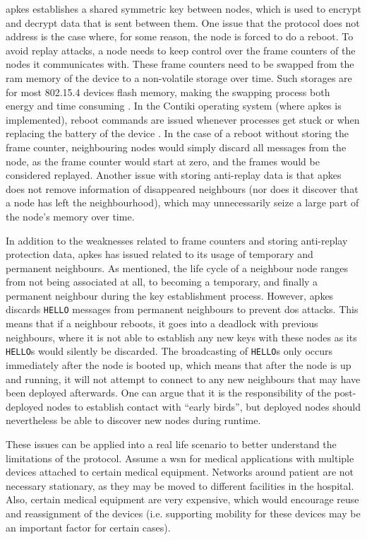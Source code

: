 \gls{apkes} establishes a shared symmetric key between nodes, which is used to encrypt and decrypt data that is sent between them. One issue that the protocol does not address is the case where, for some reason, the node is forced to do a reboot. To avoid replay attacks, a node needs to keep control over the frame counters of the nodes it communicates with. These frame counters need to be swapped from the \gls{ram} memory of the device to a non-volatile storage over time. Such storages are for most 802.15.4 devices flash memory, making the swapping process both energy and time consuming \cite{krentz2015handling}. In the Contiki operating system (where \gls{apkes} is implemented), reboot commands are issued whenever processes get stuck or when replacing the battery of the device \cite{dunkels2004contiki}. In the case of a reboot without storing the frame counter, neighbouring nodes would simply discard all messages from the node, as the frame counter would start at zero, and the frames would be considered replayed. Another issue with storing anti-replay data is that \gls{apkes} does not remove information of disappeared neighbours (nor does it discover that a node has left the neighbourhood), which may unnecessarily seize a large part of the node's memory over time.  

In addition to the weaknesses related to frame counters and storing anti-replay protection data, \gls{apkes} has issued related to its usage of temporary and permanent neighbours. As mentioned, the life cycle of a neighbour node ranges from not being associated at all, to becoming a temporary, and finally a permanent neighbour during the key establishment process. However, \gls{apkes} discards \texttt{HELLO} messages from permanent neighbours to prevent \gls{dos} attacks. This means that if a neighbour reboots, it goes into a deadlock with previous neighbours, where it is not able to establish any new keys with these nodes as its \texttt{HELLO}s would silently be discarded. The broadcasting of \texttt{HELLO}s only occurs immediately after the node is booted up, which means that after the node is up and running, it will not attempt to connect to any new neighbours that may have been deployed afterwards. One can argue that it is the responsibility of the post-deployed nodes to establish contact with ``early birds'', but deployed nodes should nevertheless be able to discover new nodes during runtime. 

These issues can be applied into a real life scenario to better understand the limitations of the protocol. Assume a \gls{wsn} for medical applications with multiple devices attached to certain medical equipment. Networks around patient are not necessary stationary, as they may be moved to different facilities in the hospital. Also, certain medical equipment are very expensive, which would encourage reuse and reassignment of the devices (i.e. supporting mobility for these devices may be an important factor for certain cases). 




